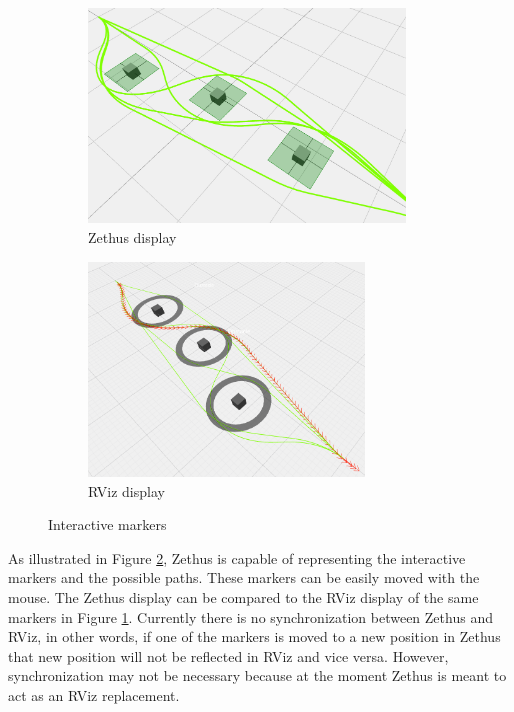     \begin{figure}[H]
            \centering
            \begin{subfigure}{.5\textwidth}
                \centering
                \includegraphics[height=5.7cm]{Images/04_markersZethus.png}
                \caption{Zethus display}
                \label{fig:markerRViz}
            \end{subfigure}%
            \begin{subfigure}{.5\textwidth}
                \centering
                \includegraphics[height=5.7cm]{Images/04_markersRViz.png}
                \caption{RViz display}
                \label{fig:markerZethus}
            \end{subfigure}
            \caption{Interactive markers}
            \label{fig:markers}
    \end{figure}
    
    As illustrated in Figure \ref{fig:markerZethus}, Zethus is capable of representing the interactive markers and the possible paths. These markers can be easily moved with the mouse. The Zethus display can be compared to the RViz display of the same markers in Figure \ref{fig:markerRViz}. Currently there is no synchronization between Zethus and RViz, in other words, if one of the markers is moved to a new position in Zethus that new position will not be reflected in RViz and vice versa. However, synchronization may not be necessary because at the moment Zethus is meant to act as an RViz replacement.


